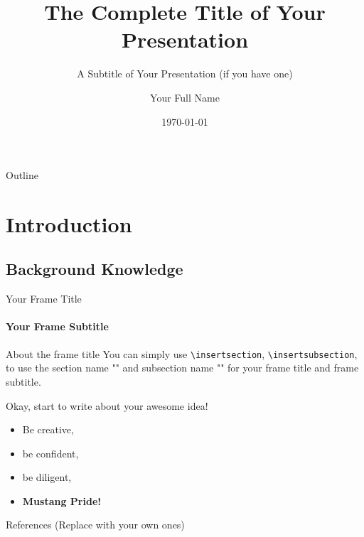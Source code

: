 \documentclass[12pt, aspectratio=169]{beamer}
\title[Presentation Title]{The Complete Title of Your Presentation}
\subtitle{A Subtitle of Your Presentation (if you have one)}
\author[Your Name]{Your Full Name}
\institute[SMU Your Dept.]{Southern Methodist University, Your Department}
\date{\today}
\begin{document}
\begin{frame}[plain]
\titlepage
\end{frame}

\begin{frame}{Outline}
\tableofcontents
\end{frame}

\section{Introduction}
\subsection{Background Knowledge}

\begin{frame}{Your Frame Title}
\framesubtitle{Your Frame Subtitle}

\begin{block}{About the frame title}
You can simply use \texttt{\textbackslash{}insertsection}, \texttt{\textbackslash{}insertsubsection}, to use the section name "\insertsection" and subsection name "\insertsubsection" for your frame title and frame subtitle.
\end{block}


Okay, start to write about your awesome idea!
\begin{itemize}
    \item Be creative,
    \item be confident,
    \item be diligent,
    \item \textcolor{SMURed}{\textbf{\serif Mustang Pride!}}
\end{itemize}
\end{frame}

\begin{frame}[allowframebreaks]{References (Replace with your own ones)}
\nocite{*}

\end{frame}
\end{document}
